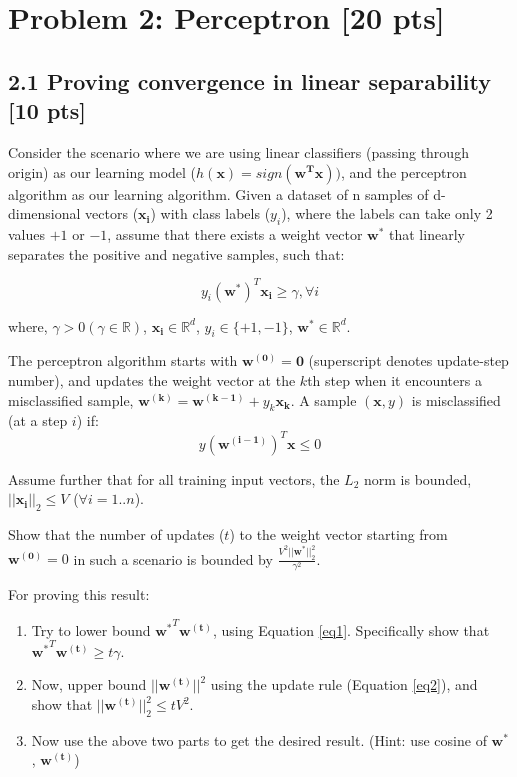 \section*{Problem 2: Perceptron [20 pts]}
\subsection*{2.1 Proving convergence in linear separability [10 pts]}

Consider the scenario where we are using linear classifiers (passing through origin) as our learning model ($h(\mathbf{x}) = sign (\mathbf{w^T x}))$, and the perceptron algorithm as our learning algorithm. Given a dataset of n samples of d-dimensional vectors ($\mathbf{x_i}$) with class labels ($y_i$), where the labels can take only 2 values $+1$ or $-1$, assume that there exists a weight vector $\mathbf{w^*}$ that linearly separates the positive and negative samples, such that:

\begin{equation}
y_i (\mathbf{w^*})^T \mathbf{x_i} \geq \gamma, \forall i
\label{eq1}
\end{equation}

where, $\gamma > 0 (\gamma \in \mathbb{R})$, 
$\mathbf{x_i} \in \mathbb{R}^d$, 
$y_i \in \{+1, -1\}$, 
$\mathbf{w^*} \in \mathbb{R}^d$. 

The perceptron algorithm starts with $\mathbf{w^{(0)}} = \mathbf{0}$ (superscript denotes update-step number), and updates the weight vector at the $k$th step when it encounters a misclassified sample, $\mathbf{w^{(k)}} = \mathbf{w^{(k-1)}} + y_k \mathbf{x_k}$. A sample $(\mathbf{x},y)$ is misclassified (at a step $i$) if:
\begin{equation}
 y {\mathbf{(w^{(i-1)})}^T \mathbf{x}} \leq 0 
 \label{eq2}
\end{equation}

Assume further that for all training input vectors, the $L_2$ norm is bounded, $||\mathbf{x_i}||_2 \leq V$ ($\forall i = 1 .. n$).

Show that the number of updates ($t$) to the weight vector starting from $\mathbf{w^{(0)}} = 0$ in such a scenario is bounded by $\frac{V^2 ||\mathbf{w^*}||^2_2}{\gamma^2}$.

For proving this result:
\begin{enumerate}
    \item Try to lower bound $\mathbf{w^*}^T\mathbf{w^{(t)}}$, using Equation \ref{eq1}. Specifically show that $\mathbf{w^*}^T\mathbf{w^{(t)}} \geq t\gamma $.
    \item Now, upper bound $||\mathbf{w^{(t)}}||^2$ using the update rule (Equation \ref{eq2}), and show that $||\mathbf{w^{(t)}}||^2_2 \leq t V^2 $.
    \item Now use the above two parts to get the desired result. (Hint: use cosine of $\mathbf{w^*}$, $\mathbf{w^{(t)}}$)
\end{enumerate}

